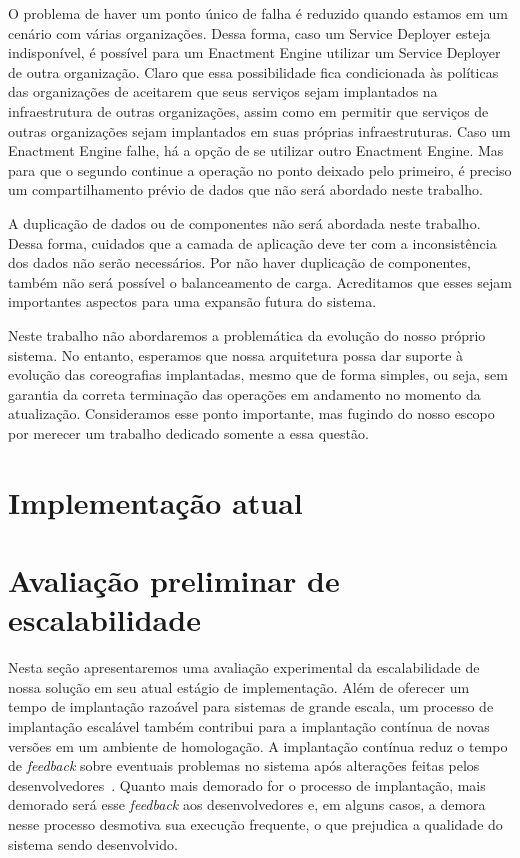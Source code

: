 O problema de haver um ponto único de falha é reduzido quando estamos em um cenário com várias organizações. Dessa forma, caso um Service Deployer esteja indisponível, é possível para um Enactment Engine utilizar um Service Deployer de outra organização. Claro que essa possibilidade fica condicionada às políticas das organizações de aceitarem que seus serviços sejam implantados na infraestrutura de outras organizações, assim como em permitir que serviços de outras organizações sejam implantados em suas próprias infraestruturas. Caso um Enactment Engine falhe, há a opção de se utilizar outro Enactment Engine. Mas para que o segundo continue a operação no ponto deixado pelo primeiro, é preciso um compartilhamento prévio de dados que não será abordado neste trabalho. 

A duplicação de dados ou de componentes não será abordada neste trabalho. Dessa forma, cuidados que a camada de aplicação deve ter com a inconsistência dos dados não serão necessários. Por não haver duplicação de componentes, também não será possível o balanceamento de carga. Acreditamos que esses sejam importantes aspectos para uma expansão futura do sistema.

Neste trabalho não abordaremos a problemática da evolução do nosso próprio sistema. No entanto, esperamos que nossa arquitetura possa dar suporte à evolução das coreografias implantadas, mesmo que de forma simples, ou seja, sem garantia da correta terminação das operações em andamento no momento da atualização. Consideramos esse ponto importante, mas fugindo do nosso escopo por merecer um trabalho dedicado somente a essa questão.

\section{Implementação atual}
\label{sec:impl_atual}

\section{Avaliação preliminar de escalabilidade}
\label{sec:avaliacao}

Nesta seção apresentaremos uma avaliação experimental da escalabilidade de nossa solução em seu atual estágio de implementação. Além de oferecer um tempo de implantação razoável para sistemas de grande escala, um processo de implantação escalável também contribui para a implantação contínua de novas versões em um ambiente de homologação. A implantação contínua reduz o tempo de \textit{feedback} sobre eventuais problemas no sistema após alterações feitas pelos desenvolvedores~\cite{Humble2011Continuous}. Quanto mais demorado for o processo de implantação, mais demorado será esse \textit{feedback} aos desenvolvedores e, em alguns casos, a demora nesse processo desmotiva sua execução frequente, o que prejudica a qualidade do sistema sendo desenvolvido.


